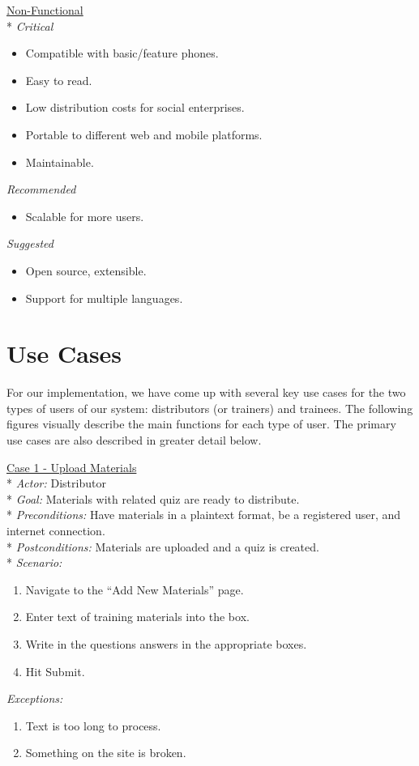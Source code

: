 \underline{Non-Functional}\\*
\textit{Critical}
\begin{itemize}
\item Compatible with basic/feature phones.
\item Easy to read.
\item Low distribution costs for social enterprises.
\item Portable to different web and mobile platforms.
\item Maintainable.
\end{itemize}

\textit{Recommended}
\begin{itemize}
\item Scalable for more users.
\end{itemize}

\textit{Suggested}
\begin{itemize}
\item Open source, extensible.
\item Support for multiple languages.
\end{itemize}

\section{Use Cases}
For our implementation, we have come up with several key use cases for the two types of users of our system: distributors (or trainers) and trainees. The following figures visually describe the main functions for each type of user. The primary use cases are also described in greater detail below.

\underline{Case 1 - Upload Materials}\\*
\textit{Actor:} Distributor\\*
\textit{Goal:} Materials with related quiz are ready to distribute.\\*
\textit{Preconditions:} Have materials in a plaintext format, be a registered user, and internet connection.\\*
\textit{Postconditions:} Materials are uploaded and a quiz is created.\\*
\textit{Scenario:}
\begin{enumerate}
	\item{Navigate to the “Add New Materials” page.}
	\item{Enter text of training materials into the box.}
	\item{Write in the questions answers in the appropriate boxes.}
	\item{Hit Submit.}
\end{enumerate}
\textit{Exceptions:}
\begin{enumerate}
	\item{Text is too long to process.}
	\item{Something on the site is broken.}\\
\end{enumerate}

